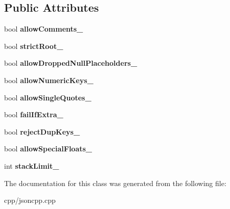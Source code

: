 \subsection*{Public Attributes}
\begin{DoxyCompactItemize}
\item 
\mbox{\label{class_json_1_1_our_features_ac71bb7ba7363d3b05ed76602b036ce33}} 
bool {\bfseries allow\+Comments\+\_\+}
\item 
\mbox{\label{class_json_1_1_our_features_a2095f66a776c0a4ae6cc931a0c94242e}} 
bool {\bfseries strict\+Root\+\_\+}
\item 
\mbox{\label{class_json_1_1_our_features_a13963bc44bf948eec1968f7ff8e8f5f1}} 
bool {\bfseries allow\+Dropped\+Null\+Placeholders\+\_\+}
\item 
\mbox{\label{class_json_1_1_our_features_af6973fc7e774ce2d634ba99442aeb91a}} 
bool {\bfseries allow\+Numeric\+Keys\+\_\+}
\item 
\mbox{\label{class_json_1_1_our_features_abbd6c196d7a22e2a360a59887eda4610}} 
bool {\bfseries allow\+Single\+Quotes\+\_\+}
\item 
\mbox{\label{class_json_1_1_our_features_ae8ad25b90706c78f1a8fe929191ac61b}} 
bool {\bfseries fail\+If\+Extra\+\_\+}
\item 
\mbox{\label{class_json_1_1_our_features_a39b8e0b86b1c24a45e800c023bb715aa}} 
bool {\bfseries reject\+Dup\+Keys\+\_\+}
\item 
\mbox{\label{class_json_1_1_our_features_af760f91cc2a7af37e44f78fb466061bb}} 
bool {\bfseries allow\+Special\+Floats\+\_\+}
\item 
\mbox{\label{class_json_1_1_our_features_a9a786713902d14be6d57a08cc03ccfff}} 
int {\bfseries stack\+Limit\+\_\+}
\end{DoxyCompactItemize}


The documentation for this class was generated from the following file\+:\begin{DoxyCompactItemize}
\item 
cpp/jsoncpp.\+cpp\end{DoxyCompactItemize}
